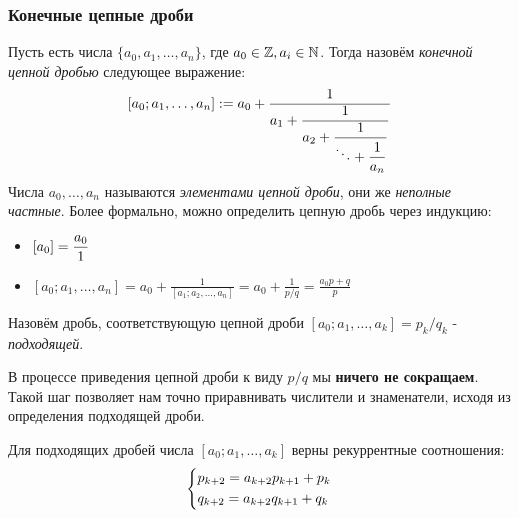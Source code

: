 \subsubsection*{Конечные цепные дроби}

\begin{definition}
	Пусть есть числа $\{a_0, a_1, \ldots, a_n\}$, где $a_0 \in \mathbb{Z}, a_i \in \mathbb{N}$. Тогда назовём \textit{конечной цепной дробью} следующее выражение:
	\[
		[a_0; a_1, \ldots, a_n] := a_0 + \frac{1}{\displaystyle a_1 + \frac{1}{\displaystyle a_2 + \frac{1}{\displaystyle \ddots + \frac{1}{a_n}}}}
	\]
	Числа $a_0, \ldots, a_n$ называются \textit{элементами цепной дроби}, они же \textit{неполные частные}.
	Более формально, можно определить цепную дробь через индукцию:
	\begin{itemize}
		\item \(\displaystyle [a_0] = \frac{a_0}{1}\)
		\item \([a_0; a_1, \ldots, a_n] = a_0 + \displaystyle\frac{1}{[a_1; a_2, \ldots, a_n]} = a_0 + \frac{1}{p/q} = \frac{a_0p + q}{p}\)
	\end{itemize}
\end{definition}

\begin{definition}
	Назовём дробь, соответствующую цепной дроби $[a_0; a_1, \ldots, a_k] = p_k/q_k$ - \textit{подходящей}.
\end{definition}

\begin{note}
	В процессе приведения цепной дроби к виду $p/q$ мы \textbf{ничего не сокращаем}. Такой шаг позволяет нам точно приравнивать числители и знаменатели, исходя из определения подходящей дроби.
\end{note}

\begin{theorem}
	Для подходящих дробей числа $[a_0; a_1, \ldots, a_k]$ верны рекуррентные соотношения:
	\[
		\left\{\begin{aligned}
			&{p_{k + 2} = a_{k + 2}p_{k + 1} + p_k}
			\\
			&{q_{k + 2} = a_{k + 2}q_{k + 1} + q_k}
		\end{aligned}\right.
	\]
\end{theorem}

